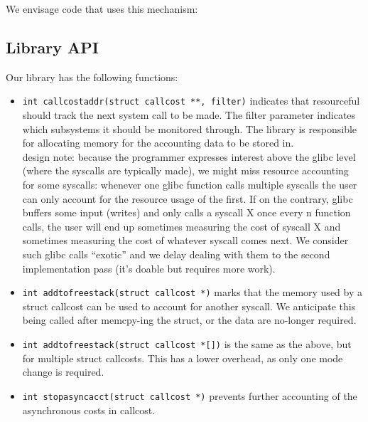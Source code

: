 \documentclass[12pt]{article}
\def\_{\textunderscore\-}
\begin{document}
  We envisage code that uses this mechanism:


  \subsection{Library API}
  Our library has the following functions:
  \begin{itemize}
  \item \texttt{int call\_cost\_addr(struct call\_cost **, filter)} indicates that resourceful should track the next system call to be made. The filter parameter indicates which subsystems it should be monitored through. The library is responsible for allocating memory for the accounting data to be stored in.\\
design note: because the programmer expresses interest above the glibc level (where the syscalls are typically made), we might miss resource accounting for some syscalls: whenever one glibc function calls multiple syscalls the user can only account for the resource usage of the first. If on the contrary, glibc buffers some input (writes) and only calls a syscall X once every n function calls, the user will end up sometimes measuring the cost of syscall X and sometimes measuring the cost of whatever syscall comes next. We consider such glibc calls “exotic” and we delay dealing with them to the second implementation pass (it’s doable but requires more work).
  \item \texttt{int add\_to\_free\_stack(struct call\_cost *)} marks that the memory used by a struct call\_cost can be used to account for another syscall. We anticipate this being called after memcpy-ing the struct, or the data are no-longer required.
  \item \texttt{int add\_to\_free\_stack(struct call\_cost *[])} is the same as the above, but for multiple struct call\_costs. This has a lower overhead, as only one mode change is required.
  \item \texttt{int stop\_async\_acct(struct call\_cost *)} prevents further accounting of the asynchronous costs in call\_cost.
  \end{itemize}
\end{document}
